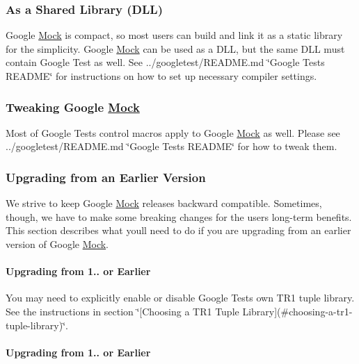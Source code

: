 \subsubsection*{As a Shared Library (D\+LL)}

Google \mbox{\hyperlink{class_mock}{Mock}} is compact, so most users can build and link it as a static library for the simplicity. Google \mbox{\hyperlink{class_mock}{Mock}} can be used as a D\+LL, but the same D\+LL must contain Google Test as well. See ../googletest/\+R\+E\+A\+D\+ME.md \char`\"{}\+Google Test\textquotesingle{}s R\+E\+A\+D\+M\+E\char`\"{} for instructions on how to set up necessary compiler settings.

\subsubsection*{Tweaking Google \mbox{\hyperlink{class_mock}{Mock}}}

Most of Google Test\textquotesingle{}s control macros apply to Google \mbox{\hyperlink{class_mock}{Mock}} as well. Please see ../googletest/\+R\+E\+A\+D\+ME.md \char`\"{}\+Google Test\textquotesingle{}s R\+E\+A\+D\+M\+E\char`\"{} for how to tweak them.

\subsubsection*{Upgrading from an Earlier Version}

We strive to keep Google \mbox{\hyperlink{class_mock}{Mock}} releases backward compatible. Sometimes, though, we have to make some breaking changes for the users\textquotesingle{} long-\/term benefits. This section describes what you\textquotesingle{}ll need to do if you are upgrading from an earlier version of Google \mbox{\hyperlink{class_mock}{Mock}}.

\paragraph*{Upgrading from 1.. or Earlier}

You may need to explicitly enable or disable Google Test\textquotesingle{}s own T\+R1 tuple library. See the instructions in section \char`\"{}\mbox{[}\+Choosing a T\+R1 Tuple
\+Library\mbox{]}(\#choosing-\/a-\/tr1-\/tuple-\/library)\char`\"{}.

\paragraph*{Upgrading from 1.. or Earlier}

